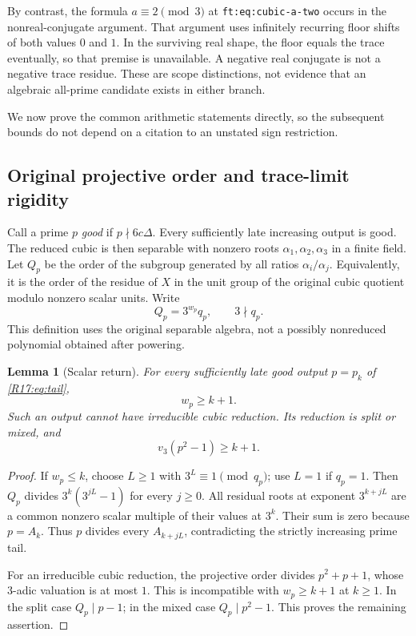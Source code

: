 \documentclass[11pt,a4paper]{article}
\newtheorem{lemma}[theorem]{Lemma}\newtheorem{proposition}[theorem]{Proposition}
\theoremstyle{definition}\newtheorem{definition}[theorem]{Definition}
\theoremstyle{remark}\newtheorem{remark}[theorem]{Remark}
\begin{document}
By contrast, the formula $a\equiv2\pmod3$ at
\texttt{ft:eq:cubic-a-two} occurs in the nonreal-conjugate argument.
That argument uses infinitely recurring floor shifts of both values $0$
and $1$. In the surviving real shape, the floor equals the trace
eventually, so that premise is unavailable. A negative real conjugate is
not a negative trace residue. These are scope distinctions, not evidence
that an algebraic all-prime candidate exists in either branch.

We now prove the common arithmetic statements directly, so the subsequent
bounds do not depend on a citation to an unstated sign restriction.

\subsection{Original projective order and trace-limit rigidity}

Call a prime $p$ \emph{good} if $p\nmid6c\Delta$. Every sufficiently
late increasing output is good. The reduced cubic is then separable
with nonzero roots $\alpha_1,\alpha_2,\alpha_3$ in a finite field.
Let $Q_p$ be the order of the subgroup generated by all ratios
$\alpha_i/\alpha_j$. Equivalently, it is the order of the residue of
$X$ in the unit group of the original cubic quotient modulo nonzero
scalar units. Write
\[
 Q_p=3^{w_p}q_p,\qquad3\nmid q_p.
\]
This definition uses the original separable algebra, not a possibly
nonreduced polynomial obtained after powering.

\begin{lemma}[Scalar return]\label{R17:lem:return}
For every sufficiently late good output $p=p_k$ of
\eqref{R17:eq:tail},
\[
 w_p\ge k+1.
\]
Such an output cannot have irreducible cubic reduction. Its reduction is
split or mixed, and
\[
 v_3(p^2-1)\ge k+1.
\]
\end{lemma}
\begin{proof}
If $w_p\le k$, choose $L\ge1$ with $3^L\equiv1\pmod{q_p}$;
use $L=1$ if $q_p=1$. Then $Q_p$ divides
$3^k(3^{jL}-1)$ for every $j\ge0$. All residual roots at exponent
$3^{k+jL}$ are a common nonzero scalar multiple of their values at
$3^k$. Their sum is zero because $p=A_k$. Thus $p$ divides every
$A_{k+jL}$, contradicting the strictly increasing prime tail.

For an irreducible cubic reduction, the projective order divides
$p^2+p+1$, whose $3$-adic valuation is at most $1$. This is incompatible
with $w_p\ge k+1$ at $k\ge1$. In the split case $Q_p\mid p-1$;
in the mixed case $Q_p\mid p^2-1$. This proves the remaining assertion.
\end{proof}
\end{document}
